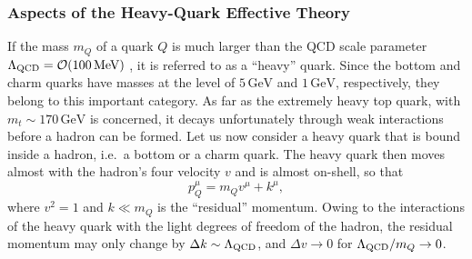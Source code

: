 \documentclass[12pt]{article}
\begin{document}
%
%
%
\subsubsection{Aspects of the Heavy-Quark Effective Theory}
%
%
%
If the mass $m_Q$ of a quark $Q$ is much larger than the QCD scale parameter
$\Lambda_{\rm QCD}={\cal O}(100\,\mbox{MeV})$ \cite{ecker}, it is referred to as 
a ``heavy'' quark. Since the bottom and charm quarks have masses at the 
level of $5\,\mbox{GeV}$ and $1\,\mbox{GeV}$, respectively, they belong 
to this important category. As far as the extremely heavy top quark, 
with $m_t\sim 170\,\mbox{GeV}$ is concerned, it decays unfortunately 
through weak interactions before a hadron can be formed. Let us now 
consider a heavy quark that is bound inside a hadron, i.e.\ a bottom 
or a charm quark. The heavy quark then moves almost with the 
hadron's four velocity $v$ and is almost on-shell, so that
\begin{equation}
p_Q^\mu=m_Qv^\mu + k^\mu,
\end{equation}
where $v^2=1$ and $k\ll m_Q$ is the ``residual'' momentum. Owing to 
the interactions of the heavy quark with the light degrees of freedom of 
the hadron, the residual momentum may only change by 
$\Delta k\sim\Lambda_{\rm QCD}$, and $\Delta v \to 0$ for 
$\Lambda_{\rm QCD}/m_Q\to 0$. 
\end{document}
